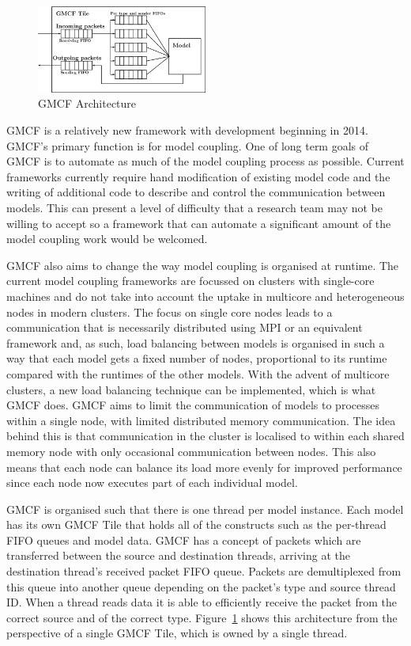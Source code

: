 \begin{figure}
    \includegraphics[width=0.5\textwidth]{graphs/gmcfArchitecture.png}
    \caption{GMCF Architecture}
    \label{fig:gmcfArchitecture}
\end{figure}

GMCF is a relatively new framework with development beginning in 2014. GMCF's
primary function is for model coupling. One of long term goals of GMCF is to
automate as much of the model coupling process as possible. Current frameworks
currently require hand modification of existing model code and the writing of
additional code to describe and control the communication between models. This
can present a level of difficulty that a research team may not be willing to
accept so a framework that can automate a significant amount of the model
coupling work would be welcomed.

GMCF also aims to change the way model coupling is organised at runtime. The
current model coupling frameworks are focussed on clusters with single-core
machines and do not take into account the uptake in multicore and heterogeneous
nodes in modern clusters. The focus on single core nodes leads to a
communication that is necessarily distributed using MPI or an equivalent
framework and, as such, load balancing between models is organised in such a way
that each model gets a fixed number of nodes, proportional to its runtime
compared with the runtimes of the other models. With the advent of multicore
clusters, a new load balancing technique can be implemented, which is what GMCF
does. GMCF aims to limit the communication of models to processes within a
single node, with limited distributed memory communication. The idea behind this
is that communication in the cluster is localised to within each shared memory
node with only occasional communication between nodes. This also means that each
node can balance its load more evenly for improved performance since each node
now executes part of each individual model.

GMCF is organised such that there is one thread per model instance. Each model
has its own GMCF Tile that holds all of the constructs such as the per-thread
FIFO queues and model data. GMCF has a concept of packets which are transferred
between the source and destination threads, arriving at the destination thread's
received packet FIFO queue. Packets are demultiplexed from this queue into
another queue depending on the packet's type and source thread ID. When a thread
reads data it is able to efficiently receive the packet from the correct source
and of the correct type. Figure~\ref{fig:gmcfArchitecture} shows this
architecture from the perspective of a single GMCF Tile, which is owned by a
single thread.


